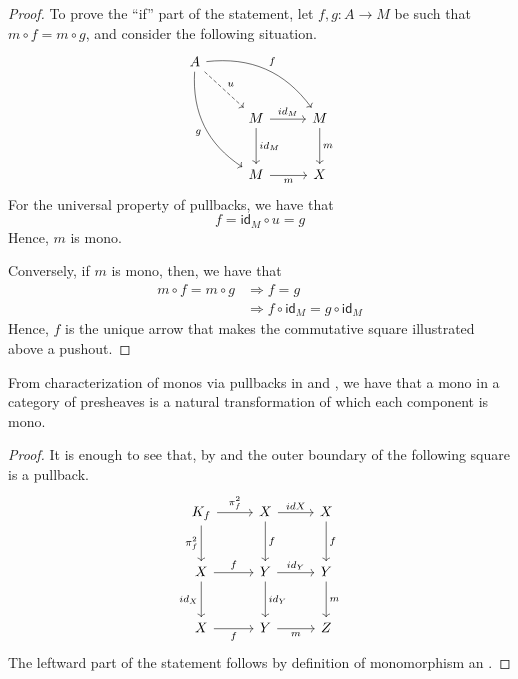 \documentclass[runningheads,envcountsect]{lipics-v2021}
\newcommand{\id}[1]{\mathsf{id}_{#1}}
\begin{document}
\begin{proof}
    To prove the ``if'' part of the statement, let $f, g: A \to M$ be such that $m\circ f = m\circ g$, and consider the following situation.
    \[
        \begin{tikzcd}[row sep=26, column sep = 26]
        A \arrow[drr, bend left=30, "f"] \arrow[ddr, bend right=30,"g" swap] \arrow[dr, dashed, "u"] & & \\
        & M  \arrow[d, "{\id{M}}"] \arrow[r, "{\id{M}}"] & M \arrow[d, "m"] \\
        & M  \arrow[r, "m" swap] & X
        \end{tikzcd}
    \]
    For the universal property of pullbacks, we have that $$f  =  \id{M} \circ u =  g$$
    Hence, $m$ is mono.

    Conversely, if $m$ is mono, then, we have that
    \begin{align*}
        m \circ f = m \circ g   &\Rightarrow    f = g \\
                                &\Rightarrow    f \circ \id{M} = g\circ \id{M}
    \end{align*}
    Hence, $f$ is the unique arrow that makes the commutative square illustrated above a pushout.   
\end{proof}

\begin{remark}\label{rem:monos_in_presh_cats}
    From characterization of monos via pullbacks in  and , we have that a mono in a category of presheaves is a natural transformation of which each component is mono.
\end{remark}

\begin{proof}
    It is enough to see that, by  and  the outer boundary of the following square is a pullback.
        \[\begin{tikzcd}[row sep=13 pt, column sep=13 pt]
    	{K_f} && X && X \\
    	\\
    	X && Y && Y \\
    	\\
    	X && Y && Z
    	\arrow["{\pi_f^2}", from=1-1, to=1-3]
    	\arrow["{\pi_f^2}"', from=1-1, to=3-1]
    	\arrow["{id{X}}", from=1-3, to=1-5]
    	\arrow["f", from=1-3, to=3-3]
    	\arrow["f", from=1-5, to=3-5]
    	\arrow["f", from=3-1, to=3-3]
    	\arrow["{id_X}"', from=3-1, to=5-1]
    	\arrow["{id_Y}", from=3-3, to=3-5]
    	\arrow["{id_Y}", from=3-3, to=5-3]
    	\arrow["m", from=3-5, to=5-5]
    	\arrow["f"', from=5-1, to=5-3]
    	\arrow["m"', from=5-3, to=5-5]
    \end{tikzcd}\]
    The leftward part of the statement follows by definition of monomorphism an .   
\end{proof}
\end{document}
